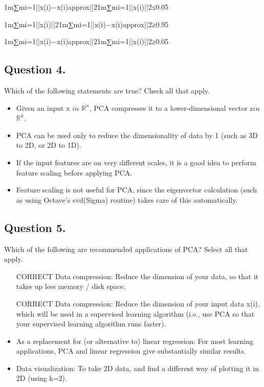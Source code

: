 \documentclass[11pt]{article} %
\begin{document}
1m∑mi=1||x(i)−x(i)approx||21m∑mi=1||x(i)||2≤0.05

1m∑mi=1||x(i)||21m∑mi=1||x(i)−x(i)approx||2≥0.95

1m∑mi=1||x(i)−x(i)approx||21m∑mi=1||x(i)||2≥0.05

\subsection{ Question 4. }
Which of the following statements are true? Check all that apply.

\begin{itemize}
	\item Given an input x $in$ $\mathbb{R}^n$, PCA compresses it to a lower-dimensional vector z$in$ $\mathbb{R}^k$.
	
	\item PCA can be used only to reduce the dimensionality of data by 1 (such as 3D to 2D, or 2D to 1D).
	
	\item If the input features are on very different scales, it is a good idea to perform feature scaling before applying PCA.
	
	\item Feature scaling is not useful for PCA, since the eigenvector calculation (such as using Octave's svd(Sigma) routine) takes care of this automatically.
\end{itemize}
\subsection{ Question 5. }
Which of the following are recommended applications of PCA? Select all that apply.

\begin{itemize}
	\item [CORRECT] Data compression: Reduce the dimension of your data, so that it takes up less memory / disk space.
	
	\item [CORRECT] Data compression: Reduce the dimension of your input data x(i), which will be used in a supervised learning algorithm (i.e., use PCA so that your supervised learning algorithm runs faster).
	
	\item As a replacement for (or alternative to) linear regression: For most learning applications, PCA and linear regression give substantially similar results.
	
	\item Data visualization: To take 2D data, and find a different way of plotting it in 2D (using k=2).
	
\end{itemize}
\end{document}
